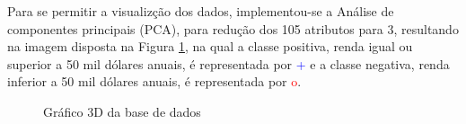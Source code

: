 Para se permitir a visualizção dos dados, implementou-se a Análise de componentes principais (PCA), para redução dos 105 atributos para 3, resultando na imagem disposta na Figura \ref{fig:dados3d}, na qual a classe positiva, renda igual ou superior a 50 mil dólares anuais, é representada por \textcolor{blue}{+} e a classe negativa, renda inferior a 50 mil dólares anuais, é representada por \textcolor{red}{o}.

\begin{figure}[h]
\centering
{}
\caption{Gráfico 3D da base de dados}
\label{fig:dados3d}
\end{figure}